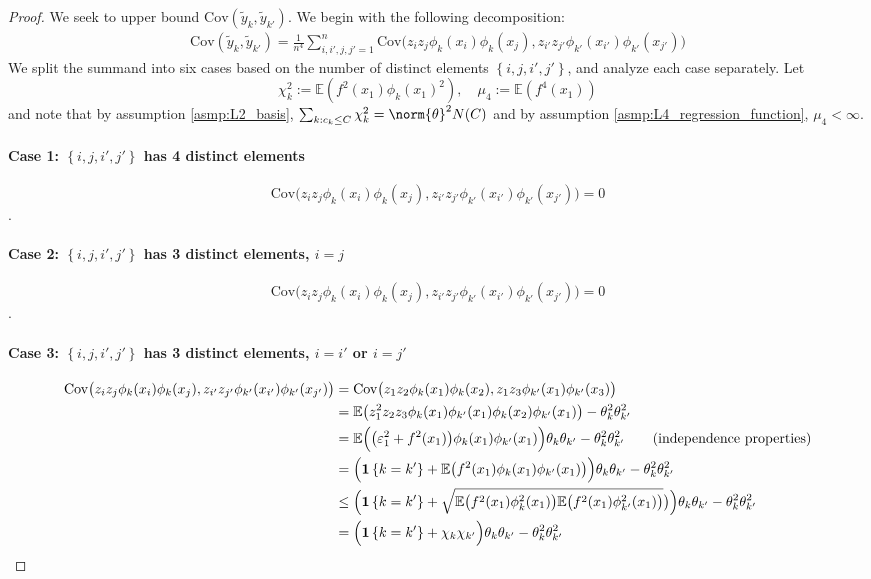 \documentclass{article}
\newcommand{\set}[1]{\left\{#1\right\}}
\newcommand{\Cov}{\mathrm{Cov}}
\newcommand{\1}{\mathbb{I}}
\newcommand{\Ebb}{\mathbb{E}}
\theoremstyle{alden}
\theoremstyle{aldenthm}
\theoremstyle{definition}
\theoremstyle{remark}
\begin{document}
\begin{proof}
	We seek to upper bound $\Cov(\widetilde{y}_k, \widetilde{y}_{k'})$. We begin with the following decomposition:
	\begin{align*}
	\Cov(\widetilde{y}_k, \widetilde{y}_{k'}) = \frac{1}{n^4} \sum_{i,i',j,j' = 1}^{n} \Cov\bigl(z_iz_j\phi_k(x_i)\phi_k(x_j), z_{i'}z_{j'}\phi_{k'}(x_{i'})\phi_{k'}(x_{j'})\bigr)
	\end{align*}
	We split the summand into six cases based on the number of distinct elements $\set{i,j,i',j'}$, and analyze each case separately. Let
	\begin{equation*}
	\chi_k^2 := \Ebb(f^2(x_1)\phi_k(x_1)^2), \quad \mu_4 := \Ebb(f^4(x_1))
	\end{equation*}
	and note that by assumption \ref{asmp:L2_basis}, $\sum_{k: c_k \leq C}\chi_k^2 = \norm{\theta}^2 N(C)$ and by assumption \ref{asmp:L4_regression_function}, $\mu_4 < \infty$.
	
	\paragraph{Case 1: $\set{i,j,i',j'}$ has 4 distinct elements}
	$$\Cov\bigl(z_iz_j\phi_k(x_i)\phi_k(x_j), z_{i'}z_{j'}\phi_{k'}(x_{i'})\phi_{k'}(x_{j'})\bigr) = 0$$.
	
	\paragraph{Case 2: $\set{i,j,i',j'}$ has 3 distinct elements, $i = j$}
	$$\Cov\bigl(z_iz_j\phi_k(x_i)\phi_k(x_j), z_{i'}z_{j'}\phi_{k'}(x_{i'})\phi_{k'}(x_{j'})\bigr) = 0$$.
	
	\paragraph{Case 3: $\set{i,j,i',j'}$ has 3 distinct elements, $i = i'$ or $i = j'$}
	\begin{align*}
	\Cov\bigl(z_iz_j\phi_k(x_i)\phi_k(x_j), z_{i'}z_{j'}\phi_{k'}(x_{i'})\phi_{k'}(x_{j'})\bigr) & = \Cov\bigl( z_1z_2 \phi_k(x_1)\phi_k(x_2) , z_1z_3 \phi_{k'}(x_1)\phi_{k'}(x_3) \bigr) \\
	& = \Ebb\bigl(z_1^2z_2z_3 \phi_k(x_1) \phi_{k'}(x_1) \phi_k(x_2) \phi_{k'}(x_1) \bigr) - \theta_k^2 \theta_{k'}^2 \\
	& = \Ebb \Bigl( \bigl(\varepsilon_1^2 + f^2(x_1) \bigr) \phi_k(x_1) \phi_{k'}(x_1) \Bigr) \theta_k \theta_{k'}  - \theta_k^2 \theta_{k'}^2 \tag{independence properties} \\
	& = \Bigl(\mathbf{1}\set{k = k'} + \Ebb\bigl(  f^2(x_1) \phi_k(x_1) \phi_{k'}(x_1) \bigr) \Bigr) \theta_k \theta_{k'} -  \theta_k^2 \theta_{k'}^2 \\
	& \leq \Bigl(\mathbf{1}\set{k = k'} + \sqrt{\Ebb\bigl(  f^2(x_1) \phi_k^2(x_1)\bigr) \Ebb\bigl(  f^2(x_1) \phi_{k'}^2(x_1)\bigr)}  \bigr) \Bigr) \theta_k \theta_{k'}  - \theta_k^2 \theta_{k'}^2 \\
	& = \Bigl(\mathbf{1}\set{k = k'} + \chi_k \chi_{k'} \Bigr) \theta_k \theta_{k'}  - \theta_k^2 \theta_{k'}^2
	\end{align*}
	

\end{proof}
\end{document}
